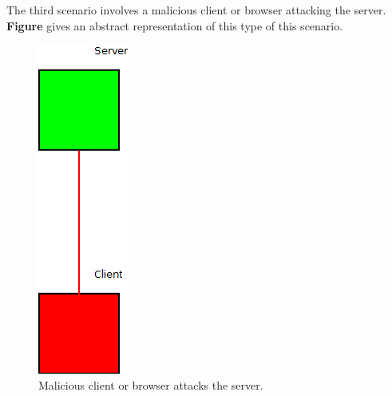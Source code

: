 The third scenario involves a malicious client or browser attacking the server. \textbf{Figure} gives an abstract representation of this type of this scenario.

\begin{figure}
	\begin{center}		
		\includegraphics[width=0.6\columnwidth]{img/security/threat-scenario-bad-browser-good-server}
		\caption{Malicious client or browser attacks the server.}
		\label{fig:threat-scenario:bad-browser-good-server}
	\end{center}
\end{figure}

